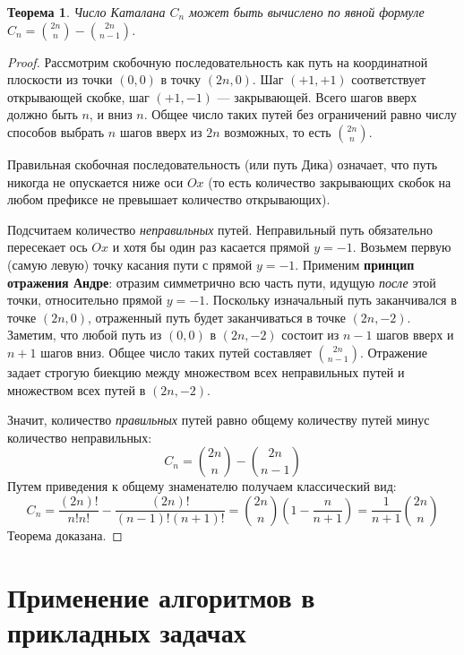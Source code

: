 \documentclass[12pt, a4paper]{article}
\newtheorem{theorem}{Теорема}
\begin{document}
\begin{theorem}
Число Каталана $C_n$ может быть вычислено по явной формуле $C_n = \binom{2n}{n} - \binom{2n}{n-1}$.
\end{theorem}
\begin{proof}
Рассмотрим скобочную последовательность как путь на координатной плоскости из точки $(0,0)$ в точку $(2n, 0)$. Шаг $(+1, +1)$ соответствует открывающей скобке, шаг $(+1, -1)$ --- закрывающей. Всего шагов вверх должно быть $n$, и вниз $n$. Общее число таких путей без ограничений равно числу способов выбрать $n$ шагов вверх из $2n$ возможных, то есть $\binom{2n}{n}$.

Правильная скобочная последовательность (или путь Дика) означает, что путь никогда не опускается ниже оси $Ox$ (то есть количество закрывающих скобок на любом префиксе не превышает количество открывающих).

Подсчитаем количество \textit{неправильных} путей. Неправильный путь обязательно пересекает ось $Ox$ и хотя бы один раз касается прямой $y = -1$.
Возьмем первую (самую левую) точку касания пути с прямой $y = -1$. Применим \textbf{принцип отражения Андре}: отразим симметрично всю часть пути, идущую \textit{после} этой точки, относительно прямой $y = -1$.
Поскольку изначальный путь заканчивался в точке $(2n, 0)$, отраженный путь будет заканчиваться в точке $(2n, -2)$.
Заметим, что любой путь из $(0,0)$ в $(2n, -2)$ состоит из $n-1$ шагов вверх и $n+1$ шагов вниз. Общее число таких путей составляет $\binom{2n}{n-1}$.
Отражение задает строгую биекцию между множеством всех неправильных путей и множеством всех путей в $(2n, -2)$.

Значит, количество \textit{правильных} путей равно общему количеству путей минус количество неправильных:
\begin{equation}
C_n = \binom{2n}{n} - \binom{2n}{n-1}
\end{equation}
Путем приведения к общему знаменателю получаем классический вид:
\begin{equation}
C_n = \frac{(2n)!}{n!n!} - \frac{(2n)!}{(n-1)!(n+1)!} = \binom{2n}{n} \left(1 - \frac{n}{n+1}\right) = \frac{1}{n+1} \binom{2n}{n}
\end{equation}
Теорема доказана.
\end{proof}

\section{Применение алгоритмов в прикладных задачах}
\end{document}
